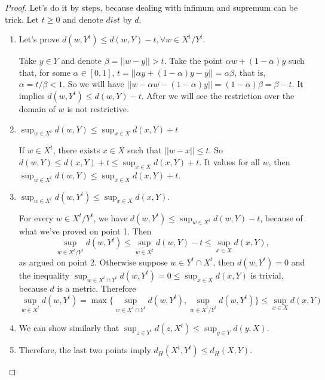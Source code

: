 \begin{proof}

Let's do it by steps, because dealing with infimum and supremum can be trick.
Let $t \ge 0$ and denote $dist$ by $d$. 

\begin{enumerate}
    \item Let's prove $d(w,Y^t) \le d(w,Y) - t, \forall w \in X^t/Y^t$. 
    
    Take $y \in Y$ and denote $\beta = ||w - y|| > t$. Take the point $\alpha
    w + (1 - \alpha)y$ such that, for some $\alpha \in [0,1]$, $t = ||\alpha y
    + (1-\alpha)y - y|| = \alpha\beta$, that is, $\alpha = t/\beta < 1$. So we
    will have $||w - \alpha w - (1 - \alpha)y|| = (1 - \alpha)\beta = \beta -
    t$. It implies $d(w,Y^t) \le d(w,Y) - t$. After we will see the restriction
    over the domain of $w$ is not restrictive. 

    \item  $\sup_{w \in X^t} d(w, Y) \le \sup_{x \in X} d(x,Y) + t$ 
    
    If $w \in X^t$, there exists $x \in X$ such that $||w - x|| \le t$.
    So $d(w, Y) \le d(x,Y) + t \le \sup_{x \in X} d(x,Y) + t$. It values for
    all $w$, then $\sup_{w \in X^t} d(w, Y) \le \sup_{x \in X} d(x,Y) + t$. 

    \item $\sup_{w \in X^t} d(w, Y^t) \le \sup_{x \in X} d(x, Y)$. 
    
    For every $w \in X^t/Y^t$,  we have $d(w, Y^t) \le \sup_{w \in X^t} d(w, Y) -
    t$, because of what we've proved on point 1. Then 
    $$\sup_{w \in X^t/Y^t}
    d(w,Y^t) \le \sup_{w \in X^t} d(w, Y) -
    t \le \sup_{x \in X} d(x,Y),$$ as argued on point 2. Otherwise suppose $w
    \in Y^t \cap X^t$, then $d(w,Y^t) = 0$ and the inequality $\sup_{w \in X^t
    \cap Y^t} d(w, Y^t) = 0 \le \sup_{x \in X} d(x,Y)$ is trivial,
    because $d$ is a metric. Therefore 
    $$
    \sup_{w \in X^t} d(w, Y^t) = \max\{\sup_{w \in X^t
    \cap Y^t} d(w, Y^t), \sup_{w \in X^t/Y^t}
    d(w,Y^t)\} \le \sup_{x \in X} d(x,Y)
    $$

    \item We can show similarly that $\sup_{z \in Y^t} d(z, X^t) \le \sup_{y
    \in Y} d(y, X)$. 

    \item Therefore, the last two points imply $d_H(X^t, Y^t) \le d_H(X,Y)$. 

\end{enumerate}


\end{proof}
